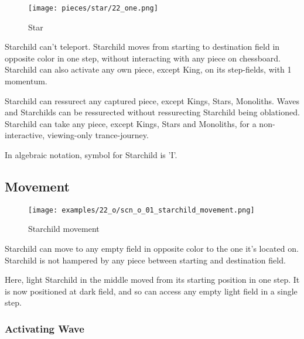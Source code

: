 \noindent
\begin{wrapfigure}[11]{l}{0.4\textwidth}
\centering
\texttt{[image: pieces/star/22\_one.png]}
\caption{Star}
\label{fig:star/22_one}
\end{wrapfigure}
Starchild can't teleport. Starchild moves from starting to destination field in opposite
color in one step, without interacting with any piece on chessboard. Starchild can also
activate any own piece, except King, on its step-fields, with 1 momentum.

Starchild can ressurect any captured piece, except Kings, Stars, Monoliths. Waves and
Starchilds can be ressurected without ressurecting Starchild being oblationed.
Starchild can take any piece, except Kings, Stars and Monoliths, for a non-interactive,
viewing-only trance-journey.

In algebraic notation, symbol for Starchild is 'I'.

\clearpage %

\subsection*{Movement}

\vspace*{-1.1\baselineskip}
\noindent
\begin{figure}[!h]
\texttt{[image: examples/22\_o/scn\_o\_01\_starchild\_movement.png]}
\caption{Starchild movement}
\label{fig:scn_o_01_starchild_movement}
\end{figure}

Starchild can move to any empty field in opposite color to the one it's located on.
Starchild is not hampered by any piece between starting and destination field.

Here, light Starchild in the middle moved from its starting position in one step.
It is now positioned at dark field, and so can access any empty light field in a
single step.

\clearpage %

\subsubsection*{Activating Wave}

